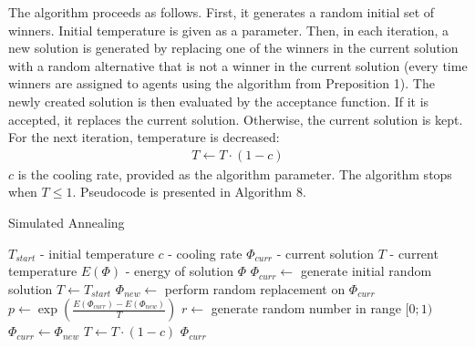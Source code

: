 The algorithm proceeds as follows. First, it generates a random initial set of winners. Initial temperature is given as a parameter. Then, in each iteration, a new solution is generated by replacing one of the winners in the current solution with a random alternative that is not a winner in the current solution (every time winners are assigned to agents using the algorithm from Preposition 1). The newly created solution is then evaluated by the acceptance function. If it is accepted, it replaces the current solution. Otherwise, the current solution is kept. For the next iteration, temperature is decreased:
\begin{gather}
	T \gets T \cdot (1 - c)
\end{gather}
$c$ is the cooling rate, provided as the algorithm parameter. The algorithm stops when $T \leq 1$. Pseudocode is presented in Algorithm 8.

\begin{algorithm}
\caption{Simulated Annealing}\label{euclid}
\begin{algorithmic}[1]
		\State $T_{start}$ - initial temperature
		\State $c$ - cooling rate
		\State $\Phi_{curr}$ - current solution
		\State $T$ - current temperature
		\State $E(\Phi)$ - energy of solution $\Phi$
		\State $\Phi_{curr} \gets$ generate initial random solution
		\State $T \gets T_{start}$
			\State $\Phi_{new} \gets$ perform random replacement on $\Phi_{curr}$
			\State $p \gets \exp(\frac{E(\Phi_{curr})-E(\Phi_{new})}{T})$
			\State $r \gets$ generate random number in range $[0;1)$
				\State $\Phi_{curr} \gets \Phi_{new}$
			\EndIf
			\State $T \gets T \cdot (1 - c)$
		\EndWhile
		\State \Return $\Phi_{curr}$
	\EndProcedure
\end{algorithmic}
\end{algorithm}
